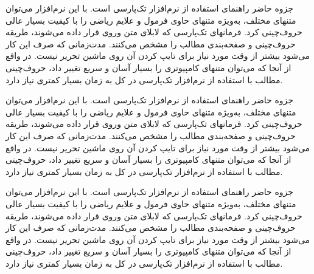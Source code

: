 \documentclass{article}
\begin{document}
جزوه حاضر راهنمای  استفاده از نرم‌افزار تک‌پارسی است. با این نرم‌افزار می‌توان متنهای مختلف، به‌ویژه متنهای حاوی فرمول و علایم ریاضی را با کیفیت بسیار عالی حروف‌چینی کرد. فرمانهای تک‌پارسی که لابلای متن وروی قرار داده می‌شوند، طریقه حروف‌چینی و صفحه‌بندی مطالب را مشخص می‌کنند. مدت‌زمانی که صرف این کار می‌شود بیشتر از وقت مورد نیاز برای تایپ کردن آن روی ماشین تحریر نیست. در واقع از آنجا که می‌توان متنهای کامپیوتری را بسیار آسان و سریع تغییر داد، حروف‌چینی مطالب با استفاده از نرم‌افزار تک‌پارسی در کل به زمان بسیار کمتری نیاز دارد.  

\bigskip
\lettrine[lraise=0.4,lines=3]{ج}%
زوه حاضر راهنمای  استفاده از نرم‌افزار تک‌پارسی است. با این نرم‌افزار می‌توان متنهای مختلف، به‌ویژه متنهای حاوی فرمول و علایم ریاضی را با کیفیت بسیار عالی حروف‌چینی کرد. فرمانهای تک‌پارسی که لابلای متن وروی قرار داده می‌شوند، طریقه حروف‌چینی و صفحه‌بندی مطالب را مشخص می‌کنند. مدت‌زمانی که صرف این کار می‌شود بیشتر از وقت مورد نیاز برای تایپ کردن آن روی ماشین تحریر نیست. در واقع از آنجا که می‌توان متنهای کامپیوتری را بسیار آسان و سریع تغییر داد، حروف‌چینی مطالب با استفاده از نرم‌افزار تک‌پارسی در کل به زمان بسیار کمتری نیاز دارد.

\bigskip
جزوه حاضر راهنمای  استفاده از نرم‌افزار تک‌پارسی است. با این نرم‌افزار می‌توان متنهای مختلف، به‌ویژه متنهای حاوی فرمول و علایم ریاضی را با کیفیت بسیار عالی حروف‌چینی کرد. فرمانهای تک‌پارسی که لابلای متن وروی قرار داده می‌شوند، طریقه حروف‌چینی و صفحه‌بندی مطالب را مشخص می‌کنند. مدت‌زمانی که صرف این کار می‌شود بیشتر از وقت مورد نیاز برای تایپ کردن آن روی ماشین تحریر نیست. در واقع از آنجا که می‌توان متنهای کامپیوتری را بسیار آسان و سریع تغییر داد، حروف‌چینی مطالب با استفاده از نرم‌افزار تک‌پارسی در کل به زمان بسیار کمتری نیاز دارد.  
\end{document}
